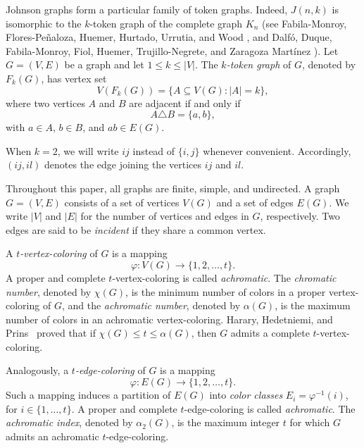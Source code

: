 \documentclass{article}
\newcommand{\blue}[1]{\textcolor{blue}{#1}}
\def\com{\textcolor{purple}}
\begin{document}
Johnson graphs form a particular family of token graphs. Indeed, $J(n,k)$ is isomorphic to the $k$-token graph of the complete graph $K_n$ (see Fabila-Monroy, Flores-Pe\~{n}aloza, Huemer, Hurtado, Urrutia, and Wood \cite{ffhhuw12}, and Dalf\'o, Duque, Fabila-Monroy, Fiol, Huemer, Trujillo-Negrete, and Zaragoza Mart\'inez \cite{ddffhtz2021}). Let $G=(V,E)$ be a graph and let $1\le k\le |V|$. The \emph{$k$-token graph} of $G$, denoted by $F_k(G)$, has vertex set
$$
V(F_k(G))=\{A\subseteq V(G): |A|=k\},
$$
where two vertices $A$ and $B$ are adjacent if and only if
$$
A\triangle B=\{a,b\},
$$
with $a\in A$, $b\in B$, and $ab\in E(G)$.

When $k=2$, we will write $ij$ instead of $\{i,j\}$ whenever convenient. Accordingly, $(ij,il)$ denotes the edge joining the vertices $ij$ and $il$.

Throughout this paper, all graphs are finite, simple, and undirected. A graph $G = (V, E)$ consists of a set of vertices $V(G)$ and a set of edges $E(G)$. We write $|V|$ and $|E|$ for the number of vertices and edges in $G$, respectively. Two edges are said to be \emph{incident} if they share a common vertex.

A \emph{$t$-vertex-coloring} of $G$ is a mapping
$$
\varphi:V(G)\to\{1,2,\ldots,t\}.
$$
A proper and complete $t$-vertex-coloring is called \emph{achromatic}. The \emph{chromatic number}, denoted by $\chi(G)$, is the minimum number of colors in a proper vertex-coloring of $G$, and the \emph{achromatic number}, denoted by $\alpha(G)$, is the maximum number of colors in an achromatic vertex-coloring. Harary, Hedetniemi, and Prins~\cite{hhp67} proved that if $\chi(G)\le t\le\alpha(G)$, then $G$ admits a complete $t$-vertex-coloring.

Analogously, a \emph{$t$-edge-coloring} of $G$ is a mapping
$$
\varphi : E(G) \to \{1, 2, \dots, t\}.
$$
Such a mapping induces a partition of $E(G)$ into \emph{color classes} $E_i = \varphi^{-1}(i)$, for $i \in \{1,\dots,t\}$.
A proper and complete $t$-edge-coloring is called \emph{achromatic}. The \emph{achromatic index}, denoted by $\alpha_2(G)$, is the maximum integer $t$ for which $G$ admits an achromatic $t$-edge-coloring.
\end{document}
